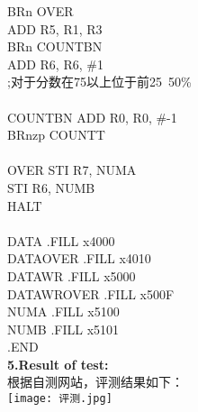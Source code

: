 \documentclass[12pt]{ctexart}
\begin{document}
\hspace*{1.5cm}BRn OVER\\
\hspace*{1.5cm}ADD R5, R1, R3\\
\hspace*{1.5cm}BRn COUNTBN\\
\hspace*{1.5cm}ADD R6, R6, \#1\\
\hspace*{1.5cm};对于分数在75以上位于前25~50\%\\
\\
COUNTBN ADD R0, R0, \#-1\\
\hspace*{1.5cm}BRnzp COUNTT\\
\\
OVER    STI R7, NUMA\\
\hspace*{1.5cm}STI R6, NUMB\\
\hspace*{1.5cm}HALT\\
\\
\hspace*{1.5cm}DATA .FILL x4000\\
\hspace*{1.5cm}DATAOVER .FILL x4010\\
\hspace*{1.5cm}DATAWR .FILL x5000\\
\hspace*{1.5cm}DATAWROVER  .FILL x500F\\
\hspace*{1.5cm}NUMA    .FILL x5100\\
\hspace*{1.5cm}NUMB    .FILL x5101\\
\hspace*{1.5cm}.END\\
{\bf5.Result of test:}\\
根据自测网站，评测结果如下：\\
\texttt{[image: 评测.jpg]}\\
\end{document}
